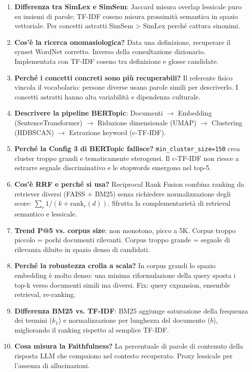 \documentclass[12pt,a4paper]{article}
\begin{document}
\begin{enumerate}
  \item \textbf{Differenza tra SimLex e SimSem}: Jaccard misura overlap lessicale puro su insiemi di parole; TF-IDF coseno misura prossimit\`a semantica in spazio vettoriale. Per concetti astratti SimSem > SimLex perch\'e cattura sinonimi.

  \item \textbf{Cos'\`e la ricerca onomasiologica?} Data una definizione, recuperare il synset WordNet corretto. Inverso della consultazione dizionario. Implementata con TF-IDF coseno tra definizione e glosse candidate.

  \item \textbf{Perch\'e i concetti concreti sono pi\`u recuperabili?} Il referente fisico vincola il vocabolario: persone diverse usano parole simili per descriverlo. I concetti astratti hanno alta variabilit\`a e dipendenza culturale.

  \item \textbf{Descrivere la pipeline BERTopic}: Documenti $\to$ Embedding (SentenceTransformer) $\to$ Riduzione dimensionale (UMAP) $\to$ Clustering (HDBSCAN) $\to$ Estrazione keyword (c-TF-IDF).

  \item \textbf{Perch\'e la Config 3 di BERTopic fallisce?} \texttt{min\_cluster\_size=150} crea cluster troppo grandi e tematicamente eterogenei. Il c-TF-IDF non riesce a estrarre segnale discriminativo e le stopwords emergono nel top-5.

  \item \textbf{Cos'\`e RRF e perch\'e si usa?} Reciprocal Rank Fusion combina ranking da retriever diversi (FAISS + BM25) senza richiedere normalizzazione degli score: $\sum_r 1/(k+\text{rank}_r(d))$. Sfrutta la complementariet\`a di retrieval semantico e lessicale.

  \item \textbf{Trend P@5 vs. corpus size}: non monotono, picco a 5K. Corpus troppo piccolo = pochi documenti rilevanti. Corpus troppo grande = segnale di rilevanza diluito in spazio denso di candidati.

  \item \textbf{Perch\'e la robustezza crolla a scala?} In corpus grandi lo spazio embedding \`e molto denso: una minima riformulazione della query sposta i top-k verso documenti simili ma diversi. Fix: query expansion, ensemble retrieval, re-ranking.

  \item \textbf{Differenza BM25 vs. TF-IDF}: BM25 aggiunge saturazione della frequenza dei termini ($k_1$) e normalizzazione per lunghezza del documento ($b$), migliorando il ranking rispetto al semplice TF-IDF.

  \item \textbf{Cosa misura la Faithfulness?} La percentuale di parole di contenuto della risposta LLM che compaiono nel contesto recuperato. Proxy lessicale per l'assenza di allucinazioni.
\end{enumerate}
\end{document}
